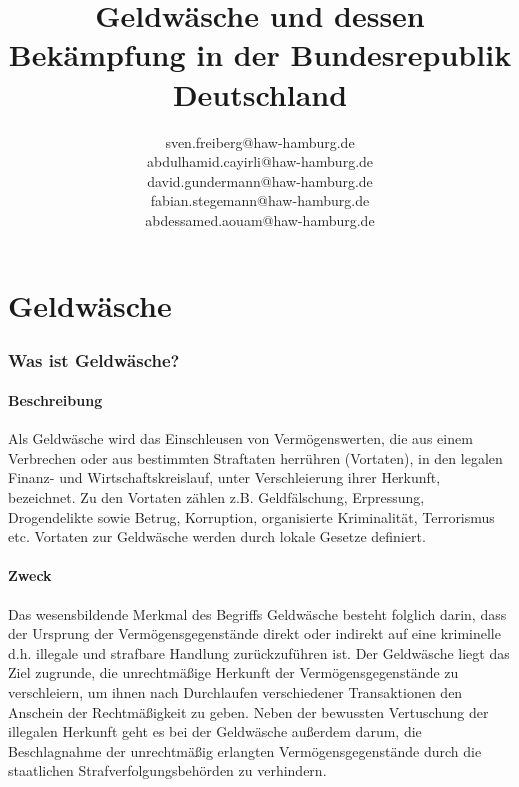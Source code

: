 \documentclass{article}
\begin{document}
\title{Geldwäsche und dessen Bekämpfung in der Bundesrepublik Deutschland}
\author{
    sven.freiberg@haw-hamburg.de\\ 
    abdulhamid.cayirli@haw-hamburg.de\\
    david.gundermann@haw-hamburg.de\\
    fabian.stegemann@haw-hamburg.de\\
    abdessamed.aouam@haw-hamburg.de
}
\maketitle

\tableofcontents


\newpage

\part[Geldwäsche]{Geldwäsche}

    \section[Was ist Geldwäsche?]{Was ist Geldwäsche?}
            
        \subsection[Beschreibung]{Beschreibung}

            Als Geldwäsche wird das Einschleusen von Vermögenswerten, die aus einem Verbrechen oder aus bestimmten Straftaten herrühren (Vortaten), in den legalen Finanz- und Wirtschaftskreislauf, unter Verschleierung ihrer Herkunft, bezeichnet. Zu den Vortaten zählen z.B. Geldfälschung, Erpressung, Drogendelikte sowie Betrug, Korruption, organisierte Kriminalität, Terrorismus etc. Vortaten zur Geldwäsche werden durch lokale Gesetze definiert.
        
        \subsection[Zweck]{Zweck}

            Das wesensbildende Merkmal des Begriffs Geldwäsche besteht folglich darin, dass der Ursprung der Vermögensgegenstände direkt oder indirekt auf eine kriminelle d.h. illegale und strafbare Handlung zurückzuführen ist.
            Der Geldwäsche liegt das Ziel zugrunde, die unrechtmäßige Herkunft der Vermögensgegenstände zu verschleiern, um ihnen nach Durchlaufen verschiedener Transaktionen den Anschein der Rechtmäßigkeit zu geben. 
            Neben der bewussten Vertuschung der illegalen Herkunft geht es bei der Geldwäsche außerdem darum, die Beschlagnahme der unrechtmäßig erlangten Vermögensgegenstände durch die staatlichen Strafverfolgungsbehörden zu verhindern.
\end{document}
